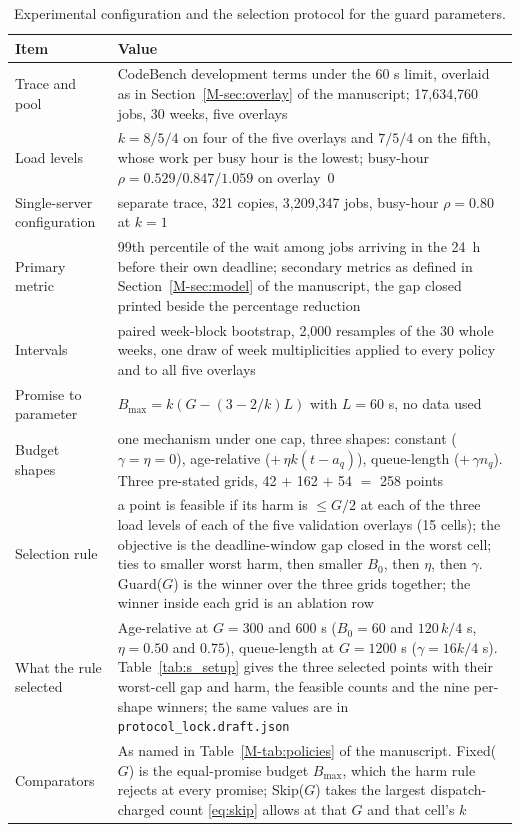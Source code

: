 \documentclass[mathematics,supfile,submit,moreauthors]{Definitions/mdpi}
\newcommand{\devnum}[1]{#1}
\begin{document}
\begin{table}[htbp]
\centering
\caption{Experimental configuration and the selection protocol for the guard parameters.}
\label{tab:setup}
\small
\begin{tabular}{p{}p{}}
\toprule
Item & Value \\
\midrule
Trace and pool & CodeBench development terms under the \devnum{60} s limit, overlaid as in Section~\ref*{M-sec:overlay} of the manuscript; \devnum{17{,}634{,}760} jobs, \devnum{30} weeks, five overlays \\
Load levels & $k = \devnum{8/5/4}$ on four of the five overlays and $\devnum{7/5/4}$ on the fifth, whose work per busy hour is the lowest; busy-hour $\rho = \devnum{0.529} / \devnum{0.847} / \devnum{1.059}$ on overlay~0 \\
Single-server configuration & separate trace, \devnum{321} copies, \devnum{3{,}209{,}347} jobs, busy-hour $\rho = \devnum{0.80}$ at $k = 1$ \\
Primary metric & 99th percentile of the wait among jobs arriving in the \devnum{24}~h before their own deadline; secondary metrics as defined in Section~\ref*{M-sec:model} of the manuscript, the gap closed printed beside the percentage reduction \\
Intervals & paired week-block bootstrap, \devnum{2{,}000} resamples of the \devnum{30} whole weeks, one draw of week multiplicities applied to every policy and to all five overlays \\
Promise to parameter & $B_{\max} = k(G - (3-2/k)L)$ with $L = \devnum{60}$ s, no data used \\
Budget shapes & one mechanism under one cap, three shapes: constant ($\gamma = \eta = 0$), age-relative ($+\,\eta k (t - a_q)$), queue-length ($+\,\gamma n_q$). Three pre-stated grids, \devnum{42} $+$ \devnum{162} $+$ \devnum{54} $=$ \devnum{258} points \\
Selection rule & a point is feasible if its harm is $\le G/2$ at each of the three load levels of each of the five validation overlays (\devnum{15} cells); the objective is the deadline-window gap closed in the worst cell; ties to smaller worst harm, then smaller $B_0$, then $\eta$, then $\gamma$. Guard($G$) is the winner over the three grids together; the winner inside each grid is an ablation row \\
What the rule selected & Age-relative at $G = \devnum{300}$ and $\devnum{600}$ s ($B_0 = \devnum{60}$ and $\devnum{120}\,k/4$ s, $\eta = \devnum{0.50}$ and $\devnum{0.75}$), queue-length at $G = \devnum{1200}$ s ($\gamma = \devnum{16}k/4$ s). Table~\ref{tab:s_setup} gives the three selected points with their worst-cell gap and harm, the feasible counts and the nine per-shape winners; the same values are in \texttt{protocol\_lock.draft.json} \\
Comparators & As named in Table~\ref*{M-tab:policies} of the manuscript. Fixed($G$) is the equal-promise budget $B_{\max}$, which the harm rule rejects at every promise; Skip($G$) takes the largest dispatch-charged count \eqref{eq:skip} allows at that $G$ and that cell's $k$ \\
\bottomrule
\end{tabular}
\end{table}
\end{document}
